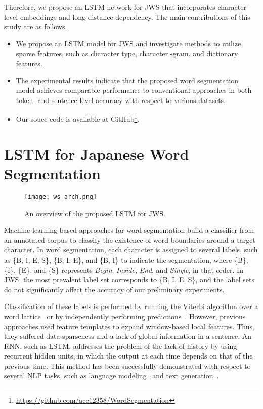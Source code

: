 \documentclass[11pt]{article}
\begin{document}
Therefore, we propose an LSTM network for JWS that incorporates
character-level embeddings and long-distance dependency.
The main contributions of this study are as follows.

\begin{itemize}

\item We propose an LSTM model for JWS and investigate methods to utilize
    sparse features, such as character type, character -gram, and dictionary
    features.

\item The experimental results indicate that the proposed word segmentation
    model achieves comparable performance to conventional approaches in both
    token- and sentence-level accuracy with respect to various datasets.

\item Our souce code is available at GitHub\footnote{\url{https://github.com/ace12358/WordSegmentation}}.

\end{itemize}

\section{LSTM for Japanese Word Segmentation}

\begin{figure*}[t]
\centering
\texttt{[image: ws\_arch.png]}              
\caption{An overview of the proposed LSTM for JWS.}    
\label{ws_arch}    
\end{figure*}

Machine-learning-based approaches for word segmentation build a classifier
from an annotated corpus to classify the existence of word boundaries around a
target character.
In word segmentation, each character is assigned to several labels, such as
\{B, I, E, S\}, \{B, I, E\}, and \{B, I\} to indicate the segmentation, where
\{B\}, \{I\}, \{E\}, and \{S\} represents {\it Begin}, {\it Inside}, {\it
End}, and {\it Single}, in that order. 
In JWS, the most prevalent label set corresponds to \{B, I, E, S\},
and the label sets do not significantly affect the accuracy of our preliminary
experiments.

Classification of these labels is performed by running the Viterbi algorithm
over a word
lattice~\cite{kudo-yamamoto-matsumoto:2004:EMNLP,nakagawa2004chinese,kaji-kitsuregawa:2013:IJCNLP}
or by independently performing
predictions~\cite{neubig-nakata-mori:2011:ACL-HLT2011}. However, previous
approaches used feature templates to expand window-based local features.
Thus, they suffered data sparseness and a lack of global information in a
sentence.
An RNN, such as LSTM, addresses the problem of the lack of history by using
recurrent hidden units, in which the output at each time depends on that of the previous time. 
This method has been successfully demonstrated with respect to several NLP
tasks, such as language modeling~\cite{mikolov2010recurrent} and text
generation~\cite{sutskever2011generating}.
\end{document}
